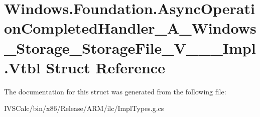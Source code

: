 \hypertarget{struct_windows_1_1_foundation_1_1_async_operation_completed_handler___a___windows___storage___st21a3608505c34cc7fe980f313e76d038}{}\section{Windows.\+Foundation.\+Async\+Operation\+Completed\+Handler\+\_\+\+A\+\_\+\+Windows\+\_\+\+Storage\+\_\+\+Storage\+File\+\_\+\+V\+\_\+\+\_\+\+\_\+\+Impl.\+Vtbl Struct Reference}
\label{struct_windows_1_1_foundation_1_1_async_operation_completed_handler___a___windows___storage___st21a3608505c34cc7fe980f313e76d038}


The documentation for this struct was generated from the following file\+:\begin{DoxyCompactItemize}
\item 
I\+V\+S\+Calc/bin/x86/\+Release/\+A\+R\+M/ilc/Impl\+Types.\+g.\+cs\end{DoxyCompactItemize}
